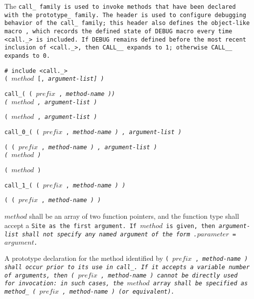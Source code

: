 \def\Subsection#1{\subsection{#1}}

The \tt{call_} family is used to invoke methods that
have been declared with the \tt{prototype_} family.
The header  is used to configure debugging behavior of the \tt{call_}
family; this header also defines the object-like macro , which records
the \tt{defined} state of \tt{DEBUG} macro every time \tt{<call._>} is included.
If \tt{DEBUG} remains defined before the most recent inclusion of \tt{<call._>},
then \tt{CALL__} expands to \tt{1}; otherwise \tt{CALL__} expands to \tt{0}.


\tt{# include <call._>}\\

\s\s\s\s\s\tt{(} $method$ [\tt{,} \it{argument-list}] \tt{)}

 \tt{call_}\s\s\s\s\s\tt{( (} $prefix$ \tt{,} \it{method-name}
\tt{)} \tt{)}\\

\s\s\s\tt{(} $method$ \tt{,} \it{argument-list} \tt{)}

\s\tt{(} $method$ \tt{,} \it{argument-list} \tt{)}

 \tt{call_0_}\s\s\s\tt{( (} $prefix$ \tt{,} \it{method-name}
\tt{) ,} \it{argument-list} \tt{)}

\s\tt{( (} $prefix$ \tt{,} \it{method-name}
\tt{) ,} \it{argument-list} \tt{)}\\

\s\s\s\tt{(} $method$ \tt{)}

\s\tt{(} $method$ \tt{)}

 \tt{call_1_}\s\s\s\tt{( (} $prefix$ \tt{,} \it{method-name} \tt{) )}

\s\tt{( (} $prefix$ \tt{,} \it{method-name} \tt{) )}


$method$ shall be an array of two function pointers, and the
function type shall accept a \tt{Site} as the first argument.
If $method$ is given, then \it{argument-list} shall not specify
any named argument of the form \tt{.}$parameter$ \tt{=} $argument$.

A prototype declaration for the method identified by \tt{(} $prefix$
\tt{,} \it{method-name} \tt{)} shall occur prior to its use in \tt{call_}.
If it accepts a variable number of arguments, then \tt{(} $prefix$
\tt{,} \it{method-name} \tt{)} cannot be directly used for invocation:
in such cases, the $method$ array shall be specified as
\tt{method_ (} $prefix$ \tt{,} \it{method-name} \tt{)} (or equivalent).

